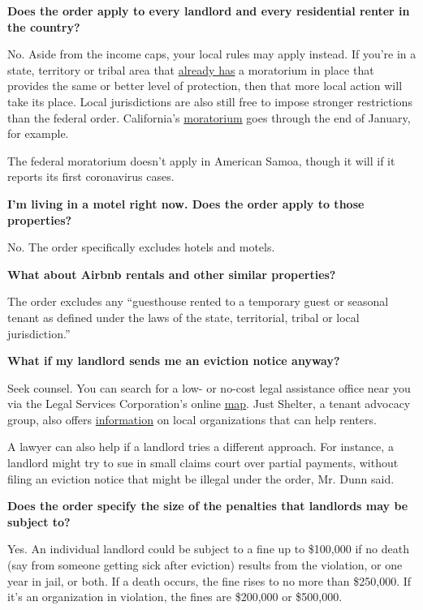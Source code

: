 \textbf{Does the order apply to every landlord and every residential
renter in the country?}

No. Aside from the income caps, your local rules may apply instead. If
you're in a state, territory or tribal area that
\href{https://evictionlab.org/covid-eviction-policies/}{already has} a
moratorium in place that provides the same or better level of
protection, then that more local action will take its place. Local
jurisdictions are also still free to impose stronger restrictions than
the federal order. California's
\href{https://www.gov.ca.gov/2020/08/31/governor-newsom-signs-statewide-covid-19-tenant-and-landlord-protection-legislation/}{moratorium}
goes through the end of January, for example.

The federal moratorium doesn't apply in American Samoa, though it will
if it reports its first coronavirus cases.

\textbf{I'm living in a motel right now. Does the order apply to those
properties?}

No. The order specifically excludes hotels and motels.

\textbf{What about Airbnb rentals and other similar properties?}

The order excludes any ``guesthouse rented to a temporary guest or
seasonal tenant as defined under the laws of the state, territorial,
tribal or local jurisdiction.''

\textbf{What if my landlord sends me an eviction notice anyway?}

Seek counsel. You can search for a low- or no-cost legal assistance
office near you via the Legal Services Corporation's online
\href{https://www.lsc.gov/what-legal-aid/find-legal-aid}{map}. Just
Shelter, a tenant advocacy group, also offers
\href{https://justshelter.org/community-resources/}{information} on
local organizations that can help renters.

A lawyer can also help if a landlord tries a different approach. For
instance, a landlord might try to sue in small claims court over partial
payments, without filing an eviction notice that might be illegal under
the order, Mr. Dunn said.

\textbf{Does the order specify the size of the penalties that landlords
may be subject to?}

Yes. An individual landlord could be subject to a fine up to \$100,000
if no death (say from someone getting sick after eviction) results from
the violation, or one year in jail, or both. If a death occurs, the fine
rises to no more than \$250,000. If it's an organization in violation,
the fines are \$200,000 or \$500,000.

